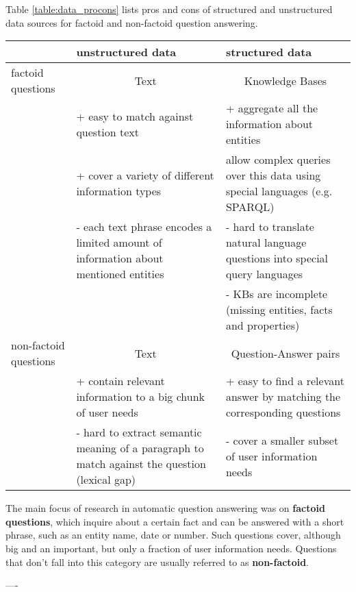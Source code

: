 Table \ref{table:data_procons} lists pros and cons of structured and unstructured data sources for factoid and non-factoid question answering.

\begin{table*}
\centering
\caption{Pros and cons of structured and unstructured data sources for factoid and non-factoid question answering}
\begin{tabular}{| l | p{6cm} | p{6cm} |}
\hline
 & unstructured data & structured data \\
\hline
factoid questions & \multicolumn{1}{|c|}{Text} & \multicolumn{1}{|c|}{Knowledge Bases} \\
 & + easy to match against question text & + aggregate all the information about entities\\
 & + cover a variety of different information types & allow complex queries over this data using special languages (e.g. SPARQL) \\
 & - each text phrase encodes a limited amount of information about mentioned entities & - hard to translate natural language questions into special query languages \\
&  & - KBs are incomplete (missing entities, facts and properties) \\
\hline
non-factoid questions & \multicolumn{1}{|c|}{Text} & \multicolumn{1}{|c|}{Question-Answer pairs} \\
 & + contain relevant information to a big chunk of user needs & + easy to find a relevant answer by matching the corresponding questions \\
 & - hard to extract semantic meaning of a paragraph to match against the question (lexical gap) & - cover a smaller subset of user information needs \\
\hline
\end{tabular}
\label{table:data_procons}
\end{table*}


The main focus of research in automatic question answering was on \textbf{factoid questions}, which inquire about a certain fact and can be answered with a short phrase, such as an entity name, date or number.
Such questions cover, although big and an important, but only a fraction of user information needs.
Questions that don't fall into this category are usually referred to as \textbf{non-factoid}.

----

